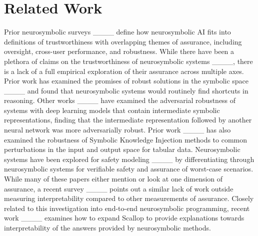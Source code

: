 \section{Related Work}
Prior neurosymbolic surveys ____ define how neurosymbolic AI fits into definitions of trustworthiness with overlapping themes of assurance, including oversight, cross-user performance, and robustness. While there have been a plethora of claims on the trustworthiness of neurosymbolic systems ____, there is a lack of a full empirical exploration of their assurance across multiple axes. Prior work has examined the promises of robust solutions in the symbolic space ____ and found that neurosymbolic systems would routinely find shortcuts in reasoning. Other works ____ have examined the adversarial robustness of systems with deep learning models that contain intermediate symbolic representations, finding that the intermediate representation followed by another neural network was more adversarially robust. Prior work ____ has also examined the robustness of Symbolic Knowledge Injection methods to common perturbations in the input and output space for tabular data. Neurosymbolic systems have been explored for safety modeling ____ by differentiating through neurosymbolic systems for verifiable safety and assurance of worst-case scenarios. While many of these papers either mention or look at one dimension of assurance, a recent survey ____ points out a similar lack of work outside measuring interpretability compared to other measurements of assurance. Closely related to this investigation into end-to-end neurosymbolic programming, recent work ____ examines how to expand Scallop to provide explanations towards interpretability of the answers provided by neurosymbolic methods.